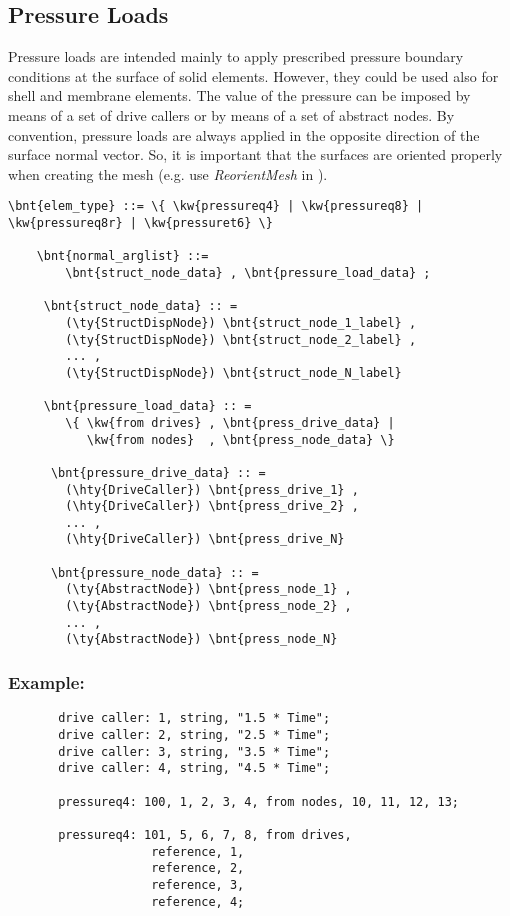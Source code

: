 \subsection{Pressure Loads}
Pressure loads are intended mainly to apply prescribed pressure boundary conditions at the surface of solid elements.
However, they could be used also for shell and membrane elements. The value of the pressure can be imposed
by means of a set of drive callers or by means of a set of abstract nodes. By convention, pressure loads are always applied
in the opposite direction of the surface normal vector. So, it is important that the surfaces are oriented properly
when creating the mesh (e.g. use \emph{ReorientMesh} in ).
\begin{Verbatim}[commandchars=\\\{\}]
  \bnt{elem_type} ::= \{ \kw{pressureq4} | \kw{pressureq8} | \kw{pressureq8r} | \kw{pressuret6} \}

    \bnt{normal_arglist} ::=
        \bnt{struct_node_data} , \bnt{pressure_load_data} ;

     \bnt{struct_node_data} :: =
        (\ty{StructDispNode}) \bnt{struct_node_1_label} ,
        (\ty{StructDispNode}) \bnt{struct_node_2_label} ,
        ... ,
        (\ty{StructDispNode}) \bnt{struct_node_N_label}

     \bnt{pressure_load_data} :: =
        \{ \kw{from drives} , \bnt{press_drive_data} |
           \kw{from nodes}  , \bnt{press_node_data} \}

      \bnt{pressure_drive_data} :: =
        (\hty{DriveCaller}) \bnt{press_drive_1} ,
        (\hty{DriveCaller}) \bnt{press_drive_2} ,
        ... ,
        (\hty{DriveCaller}) \bnt{press_drive_N}

      \bnt{pressure_node_data} :: =
        (\ty{AbstractNode}) \bnt{press_node_1} ,
        (\ty{AbstractNode}) \bnt{press_node_2} ,
        ... ,
        (\ty{AbstractNode}) \bnt{press_node_N}

\end{Verbatim}

\subsubsection{Example:}
\begin{verbatim}
       drive caller: 1, string, "1.5 * Time";
       drive caller: 2, string, "2.5 * Time";
       drive caller: 3, string, "3.5 * Time";
       drive caller: 4, string, "4.5 * Time";

       pressureq4: 100, 1, 2, 3, 4, from nodes, 10, 11, 12, 13;

       pressureq4: 101, 5, 6, 7, 8, from drives, 
                    reference, 1, 
                    reference, 2, 
                    reference, 3, 
                    reference, 4;
\end{verbatim}

